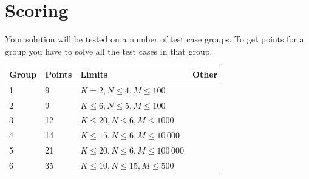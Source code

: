\section*{Scoring}
Your solution will be tested on a number of test case groups. To get points for a group
you have to solve all the test cases in that group.

\begin{tabular}{| l | l | l | l |}
\hline
Group & Points & Limits & Other \\ \hline
	1     & 9          & $K = 2, N \le 4, M \le 100$ \\ \hline
	2     & 9          & $K \le 6, N \le 5, M \le 100$ \\ \hline
	3     & 12         & $K \le 20, N \le 6, M \le 1000$ \\ \hline
	4     & 14         & $K \le 15, N \le 6, M \le 10\,000$ \\ \hline
	5     & 21         & $K \le 20, N \le 6, M \le 100\,000$ \\ \hline
	6     & 35         & $K \le 10, N \le 15, M \le 500$ \\ \hline
\end{tabular}
